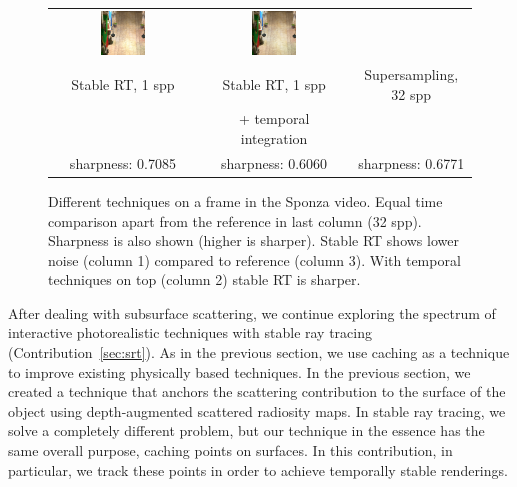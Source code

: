 \begin{figure}[t]
\begin{tabular}{@{}c@{}c@{}@{}c@{}}
	 	 \includegraphics[width=0.32\textwidth]{figures/srt_1_ti_rect_370_300_300_300_frame_211.png} &
	  \includegraphics[width=0.32\textwidth]{figures/ss_32x_rect_370_300_300_300_frame_211.png}
 \\
Stable RT, 1 spp & Stable RT, 1 spp & Supersampling, 32 spp \\
 & + temporal integration &  \\
sharpness: 0.7085 & sharpness: 0.6060 & sharpness: 0.6771 \\[-1.5ex]
\end{tabular}
\caption{Different techniques on a frame in the Sponza video. Equal time comparison apart from the reference in last column (32 spp). Sharpness is also shown (higher is sharper). Stable RT shows lower noise (column 1) compared to reference (column 3). With temporal techniques on top (column 2) stable RT is sharper.  }
\label{fig:sponza_video_frame}
\end{figure}

After dealing with subsurface scattering, we continue exploring the spectrum of interactive photorealistic techniques with stable ray tracing (Contribution~\ref{sec:srt}). As in the previous section, we use caching as a technique to improve existing physically based techniques. In the previous section, we created a technique that anchors the scattering contribution to the surface of the object using depth-augmented scattered radiosity maps. In stable ray tracing, we solve a completely different problem, but our technique in the essence has the same overall purpose, caching points on surfaces. In this contribution, in particular, we track these points in order to achieve temporally stable renderings. 

